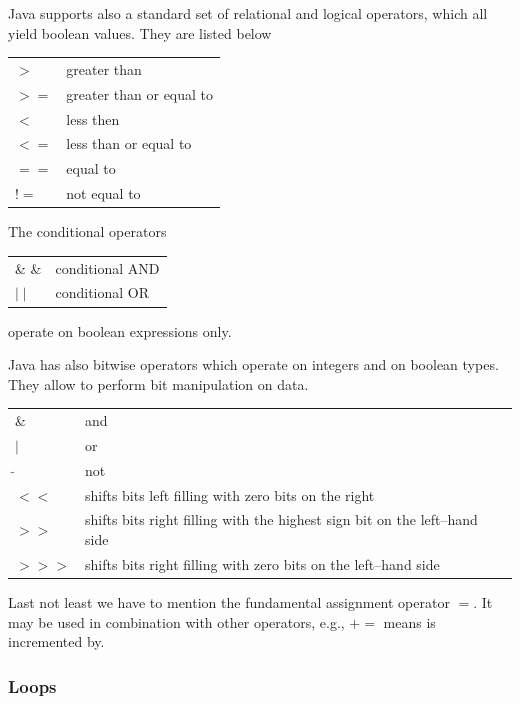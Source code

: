 Java supports also a standard set of relational and logical operators,
which all yield boolean values. They are listed below

\begin{center}
\begin{tabular}{ll}
$>$  & greater than \\
$>=$ & greater than or equal to \\
$<$  & less then \\
$<=$ & less than or equal to \\
$==$ & equal to \\
$!=$ & not equal to
\end{tabular}
\end{center}


The conditional operators
\begin{center}
\begin{tabular}{ll}
\& \& & conditional AND      \\
$\mid\mid$ & conditional OR
\end{tabular}
\end{center}
operate on  boolean expressions only.

Java has also bitwise operators which operate on integers and on
boolean types. They allow to perform bit manipulation on data.
\begin{center}
\begin{tabular}{ll}
\& & and \\
$\mid$ & or \\
$\tilde{}$ & not \\
$<<$ &  shifts bits left filling with zero bits on the right \\
$>>$ & shifts bits right filling with the highest sign bit on the
           left--hand side \\
$ >>>$ & shifts bits right filling with zero bits on the left--hand side 
\end{tabular}
\end{center}

Last not least we have to mention the fundamental assignment operator
$=$. It may be used in combination with other operators, e.g., $+=$
means is incremented by.


\subsubsection{Loops}
